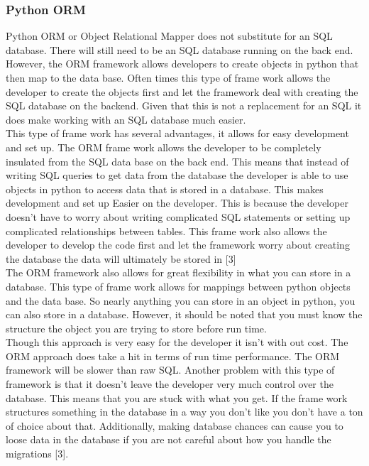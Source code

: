 \documentclass[onecolumn, draftclsnofoot,10pt, compsoc]{article}
\begin{document}
		\subsubsection{Python ORM}
				Python ORM or Object Relational Mapper does not substitute for an SQL database. There will still need to be an SQL database running on the back end. However, the ORM framework allows developers to create objects in python that then map to the data base. Often times this type of frame work allows the developer to create the objects first and let the framework deal with creating the SQL database on the backend. Given that this is not a replacement for an SQL it does make working with an SQL database much easier.\\
				This type of frame work has several advantages, it allows for easy development and set up. The ORM frame work allows the developer to be completely insulated from the SQL data base on the back end. This means that instead of writing SQL queries to get data from the database the developer is able to use objects in python to access data that is stored in a database. This makes development and set up Easier on the developer. This is because the developer doesn't have to worry about writing complicated SQL statements or setting up complicated relationships between tables. This frame work also allows the developer to develop the code first and let the framework worry about creating the database the data will ultimately be stored in [3]\\
				The ORM framework also allows for great flexibility in what you can store in a database. This type of frame work allows for mappings between python objects and the data base. So nearly anything you can store in an object in python, you can also store in a database. However, it should be noted that you must know the structure the object you are trying to store before run time.\\
				Though this approach is very easy for the developer it isn't with out cost. The ORM approach does take a hit in terms of run time performance. The ORM framework will be slower than raw SQL. Another problem with this type of framework is that it doesn’t leave the developer very much control over the database. This means that you are stuck with what you get. If the frame work structures something in the database in a way you don't like you don't have a ton of choice about that. Additionally, making database chances can cause you to loose data in the database if you are not careful about how you handle the migrations [3].\\
				
\end{document}
